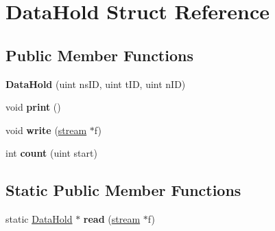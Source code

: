 \hypertarget{struct_data_hold}{}\section{Data\+Hold Struct Reference}
\label{struct_data_hold}
\subsection*{Public Member Functions}
\begin{DoxyCompactItemize}
\item 
\mbox{\label{struct_data_hold_aab19e78f263134ddf49b032b035c4a8f}} 
{\bfseries Data\+Hold} (uint ns\+ID, uint t\+ID, uint n\+ID)
\item 
\mbox{\label{struct_data_hold_acf2518a53dc1f3eca61d8cb573540230}} 
void {\bfseries print} ()
\item 
\mbox{\label{struct_data_hold_aabf132bdb2fe1613da0c2e5732af07b6}} 
void {\bfseries write} (\hyperlink{structstream}{stream} $\ast$f)
\item 
\mbox{\label{struct_data_hold_acd46ba9f1539b30989c016d55fe7803a}} 
int {\bfseries count} (uint start)
\end{DoxyCompactItemize}
\subsection*{Static Public Member Functions}
\begin{DoxyCompactItemize}
\item 
\mbox{\label{struct_data_hold_a4f6f4b5e6880374ede633273d6c2b14e}} 
static \hyperlink{struct_data_hold}{Data\+Hold} $\ast$ {\bfseries read} (\hyperlink{structstream}{stream} $\ast$f)
\end{DoxyCompactItemize}
